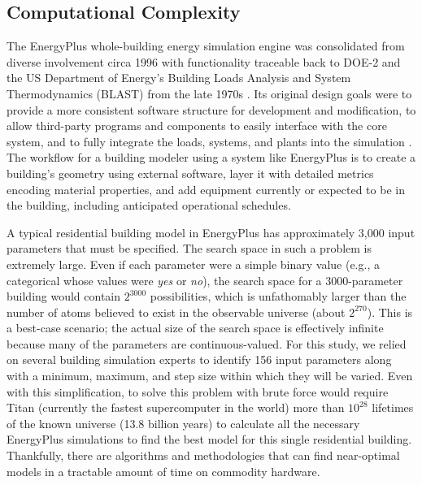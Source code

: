 \documentclass[preprint, review, 12pt]{elsarticle}
\begin{document}
\subsection{Computational Complexity}
The EnergyPlus whole-building energy simulation engine was consolidated from diverse involvement circa 1996 with functionality traceable back to DOE-2 and the US Department of Energy's Building Loads Analysis and System Thermodynamics (BLAST) from the late 1970s \cite{cit:energyplus}. Its original design goals were to provide a more consistent software structure for development and modification, to allow third-party programs and components to easily interface with the core system, and to fully integrate the loads, systems, and plants into the simulation \cite{cit:energyplus}. The workflow for a building modeler using a system like EnergyPlus is to create a building's geometry using external software, layer it with detailed metrics encoding material properties, and add equipment currently or expected to be in the building, including anticipated operational schedules.

A typical residential building model in EnergyPlus has approximately 3,000 input parameters that must be specified. The search space in such a problem is extremely large. Even if each parameter were a simple binary value (e.g., a categorical whose values were \emph{yes} or \emph{no}), the search space for a 3000-parameter building would contain $2^{3000}$ possibilities, which is unfathomably larger than the number of atoms believed to exist in the observable universe (about $2^{270}$). This is a best-case scenario; the actual size of the search space is effectively infinite because many of the parameters are continuous-valued. For this study, we relied on several building simulation experts to identify 156 input parameters along with a minimum, maximum, and step size within which they will be varied. Even with this simplification, to solve this problem with brute force would require Titan (currently the fastest supercomputer in the world) more than $10^{28}$ lifetimes of the known universe (13.8 billion years) to calculate all the necessary EnergyPlus simulations to find the best model for this single residential building. Thankfully, there are algorithms and methodologies that can find near-optimal models in a tractable amount of time on commodity hardware.
\end{document}
